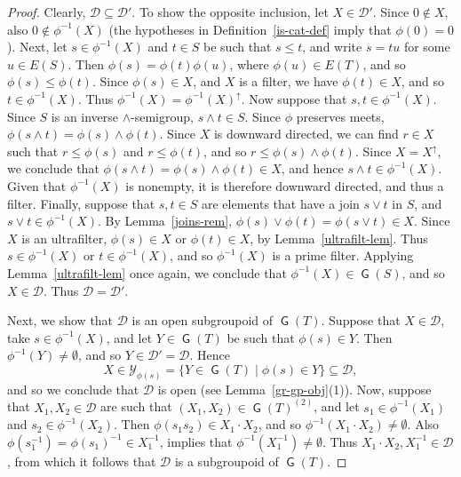 \documentclass[a4paper,reqno,12pt]{amsart}
\numberwithin{equation}{section}
\theoremstyle{plain}
\theoremstyle{definition}
\newcommand{\GP}{\operatorname{\mathsf{G}}}
\begin{document}
\begin{proof}
Clearly, $\mathcal{D} \subseteq \mathcal{D}'$. To show the opposite inclusion, let $X \in \mathcal{D}'$. Since $0 \notin X$, also $0 \notin \phi^{-1}(X)$ (the hypotheses in Definition~\ref{is-cat-def} imply that $\phi(0) = 0$). Next, let $s \in \phi^{-1}(X)$ and $t \in S$ be such that $s \leq t$, and write $s = tu$ for some $u \in E(S)$. Then $\phi(s) = \phi(t)\phi(u)$, where $\phi(u) \in E(T)$, and so $\phi(s) \leq \phi(t)$. Since $\phi(s) \in X$, and $X$ is a filter, we have $\phi(t) \in X$, and so $t \in \phi^{-1}(X)$. Thus $\phi^{-1}(X) = \phi^{-1}(X)^{\uparrow}$. Now suppose that $s,t \in \phi^{-1}(X)$. Since $S$ is an inverse $\land$-semigroup, $s \land t \in S$. Since $\phi$ preserves meets, $\phi(s \land t) = \phi(s) \land \phi(t)$. Since $X$ is downward directed, we can find $r \in X$ such that $r \leq \phi(s)$ and $r \leq \phi(t)$, and so $r \leq \phi(s) \land \phi(t)$. Since $X = X^{\uparrow}$, we conclude that $\phi(s \land t) = \phi(s) \land \phi(t) \in X$, and hence $s \land t \in \phi^{-1}(X)$. Given that $\phi^{-1}(X)$ is nonempty, it is therefore downward directed, and thus a filter. Finally, suppose that $s,t \in S$ are elements that have a join $s \lor t$ in $S$, and $s \lor t \in \phi^{-1}(X)$. By Lemma~\ref{joins-rem}, $\phi(s) \lor \phi(t) = \phi(s \lor t) \in X$. Since $X$ is an ultrafilter, $\phi(s) \in X$ or  $\phi(t) \in X$, by Lemma~\ref{ultrafilt-lem}. Thus $s \in \phi^{-1}(X)$ or $t \in \phi^{-1}(X)$, and so $\phi^{-1}(X)$ is a prime filter. Applying Lemma~\ref{ultrafilt-lem} once again, we conclude that $\phi^{-1}(X) \in \GP(S)$, and so $X \in \mathcal{D}$. Thus $\mathcal{D} = \mathcal{D}'$.

Next, we show that $\mathcal{D}$ is an open subgroupoid of $\GP(T)$. Suppose that $X \in \mathcal{D}$, take $s \in \phi^{-1}(X)$, and let $Y \in \GP(T)$ be such that $\phi(s) \in Y$. Then $\phi^{-1}(Y) \neq \emptyset$, and so $Y \in \mathcal{D}' = \mathcal{D}$. Hence 
\[X \in \mathcal{Y}_{\phi(s)} = \big\{Y \in \GP(T) \mid \phi(s) \in Y\big\} \subseteq \mathcal{D},\]
and so we conclude that $\mathcal{D}$ is open (see Lemma~\ref{gr-gp-obj}(1)). Now, suppose that $X_1,X_2 \in \mathcal{D}$ are such that $(X_1,X_2) \in \GP(T)^{(2)}$, and let $s_1 \in \phi^{-1}(X_1)$ and $s_2 \in \phi^{-1}(X_2)$. Then $\phi(s_1s_2) \in X_1 \cdot X_2$, and so $\phi^{-1}(X_1 \cdot X_2) \neq \emptyset$. Also $\phi(s_1^{-1}) = \phi(s_1)^{-1} \in X_1^{-1}$, implies that $\phi^{-1}(X_1^{-1}) \neq \emptyset$. Thus $X_1 \cdot X_2, X_1^{-1} \in \mathcal{D}$, from which it follows that $\mathcal{D}$ is a subgroupoid of $\GP(T)$.


\end{proof}
\end{document}
